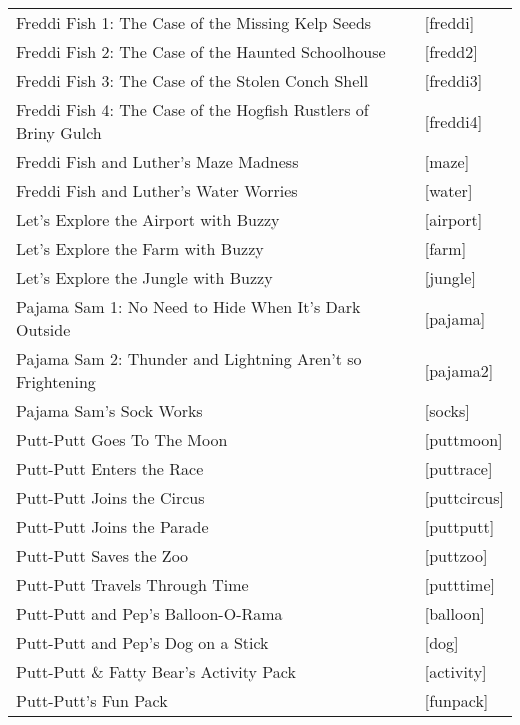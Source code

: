 \begin{itemize}
\begin{tabular}[h]{ll}
    Freddi Fish 1: The Case of the Missing Kelp Seeds&             [freddi]\\
    Freddi Fish 2: The Case of the Haunted Schoolhouse&            [fredd2]\\
    Freddi Fish 3: The Case of the Stolen Conch Shell&             [freddi3]\\
    Freddi Fish 4: The Case of the Hogfish Rustlers of Briny Gulch&[freddi4]\\
    Freddi Fish and Luther's Maze Madness&                         [maze]\\
    Freddi Fish and Luther's Water Worries&                        [water]\\
    Let's Explore the Airport with Buzzy&                          [airport]\\
    Let's Explore the Farm with Buzzy&                             [farm]\\
    Let's Explore the Jungle with Buzzy&                           [jungle]\\
    Pajama Sam 1: No Need to Hide When It's Dark Outside&          [pajama]\\
    Pajama Sam 2: Thunder and Lightning Aren't so Frightening&     [pajama2]\\
    Pajama Sam's Sock Works&                                       [socks]\\
    Putt-Putt Goes To The Moon&                                    [puttmoon]\\
    Putt-Putt Enters the Race&                                     [puttrace]\\
    Putt-Putt Joins the Circus&                                    [puttcircus]\\
    Putt-Putt Joins the Parade&                                    [puttputt]\\
    Putt-Putt Saves the Zoo&                                       [puttzoo]\\
    Putt-Putt Travels Through Time&                                [putttime]\\
    Putt-Putt and Pep's Balloon-O-Rama&                            [balloon]\\
    Putt-Putt and Pep's Dog on a Stick&                            [dog]\\
    Putt-Putt \& Fatty Bear's Activity Pack&                       [activity]\\
    Putt-Putt's Fun Pack&                                          [funpack]\\

\end{tabular}
\end{itemize}
